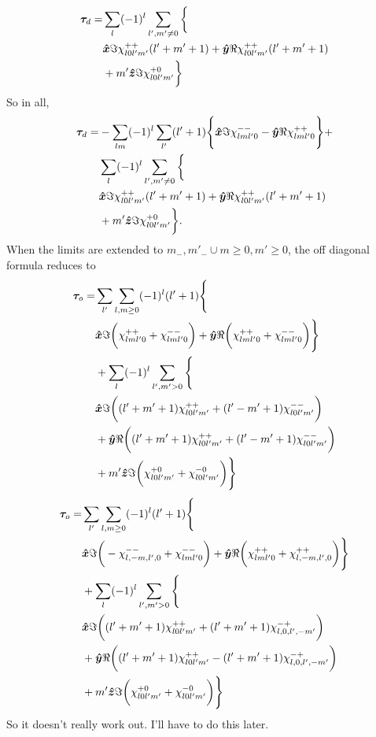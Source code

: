 \documentclass[aps,twocolumn,secnumarabic,balancelastpage,amsmath,amssymb,nofootinbib,floatfix]{revtex4-1}
\begin{document}
\begin{equation*}
\begin{aligned}
\bm \tau_d = &\sum_{l}(-1)^l\sum_{l',m'\neq 0}\bigg\{ \\
&\bm{\hat x}\Im\chi_{l0l'm'}^{++}(l'+m'+1)+\bm{\hat y}\Re\chi_{l0l'm'}^{++}(l'+m'+1)\\
&+m'\bm{\hat z} \Im\chi_{l0l'm'}^{+0}\bigg\}
\end{aligned}
\end{equation*}
So in all,
\begin{equation*}
\begin{aligned}
\bm \tau_d = &-\sum_{lm}(-1)^l\sum_{l'}(l'+1)\Bigg\{\bm{\hat x}\Im\chi_{lml'0}^{--} - \bm{\hat y}\Re\chi_{lml'0}^{++}\Bigg\}+\\
 &\sum_{l}(-1)^l\sum_{l',m'\neq 0}\bigg\{ \\
&\bm{\hat x}\Im\chi_{l0l'm'}^{++}(l'+m'+1)+\bm{\hat y}\Re\chi_{l0l'm'}^{++}(l'+m'+1)\\
&+m'\bm{\hat z} \Im\chi_{l0l'm'}^{+0}\bigg\}.
\end{aligned}
\end{equation*}
When the limits are extended to $m_-,m'_- \cup m\geq 0, m' \geq 0$, the off diagonal formula reduces to
\begin{equation*}
\begin{aligned}
\bm \tau_o = &\sum_{l'}\sum_{l,m\geq0}(-1)^l(l'+1)\Bigg\{\\
&\bm{\hat x} \Im\bigg(\chi_{lml'0}^{++} + \chi_{lml'0}^{--}\bigg)+\bm{\hat y} \Re\bigg(\chi_{lml'0}^{++} + \chi_{lml'0}^{--}\bigg)\Bigg\}\\
&+\sum_{l}(-1)^l\sum_{l',m'>0}\Bigg\{\\
&\bm{\hat x} \Im\bigg((l'+m'+1)\chi_{l0l'm'}^{++} + (l'-m'+1)\chi_{l0l'm'}^{--}\bigg)\\
&+\bm{\hat y} \Re\bigg((l'+m'+1)\chi_{l0l'm'}^{++} + (l'-m'+1)\chi_{l0l'm'}^{--}\bigg)\\
&+m'\bm{\hat z}\Im\bigg(\chi_{l0l'm'}^{+0}+\chi_{l0l'm'}^{-0}\bigg)\Bigg\}
\end{aligned}
\end{equation*}
\begin{equation*}
\begin{aligned}
\bm \tau_o = &\sum_{l'}\sum_{l,m\geq0}(-1)^l(l'+1)\Bigg\{\\
&\bm{\hat x} \Im\bigg(-\chi_{l,-m,l',0}^{--} + \chi_{lml'0}^{--}\bigg)+\bm{\hat y} \Re\bigg(\chi_{lml'0}^{++} + \chi_{l,-m,l',0}^{++}\bigg)\Bigg\}\\
&+\sum_{l}(-1)^l\sum_{l',m'>0}\Bigg\{\\
&\bm{\hat x} \Im\bigg((l'+m'+1)\chi_{l0l'm'}^{++} + (l'+m'+1)\chi_{l,0,l',-m'}^{-+}\bigg)\\
&+\bm{\hat y} \Re\bigg((l'+m'+1)\chi_{l0l'm'}^{++} - (l'+m'+1)\chi_{l,0,l',-m'}^{-+}\bigg)\\
&+m'\bm{\hat z}\Im\bigg(\chi_{l0l'm'}^{+0}+\chi_{l0l'm'}^{-0}\bigg)\Bigg\}
\end{aligned}
\end{equation*}
So it doesn't really work out. I'll have to do this later.


\clearpage


\end{document}
